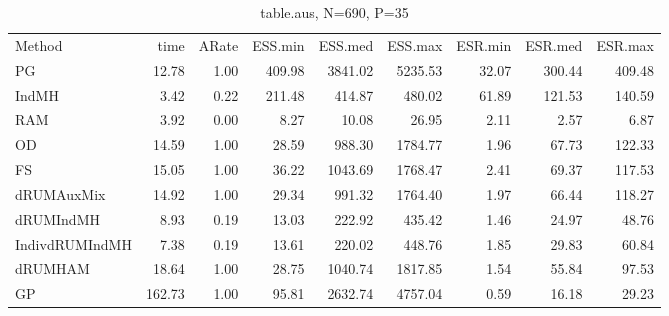 \begin{table}
\label{tab:blogit-aus}
\begin{tabular}{l r r r r r r r r } 
          Method  &     time &    ARate &  ESS.min &  ESS.med &  ESS.max &  ESR.min &  ESR.med &  ESR.max \\ 
              PG  &    12.78 &     1.00 &   409.98 &  3841.02 &  5235.53 &    32.07 &   300.44 &   409.48 \\ 
           IndMH  &     3.42 &     0.22 &   211.48 &   414.87 &   480.02 &    61.89 &   121.53 &   140.59 \\ 
             RAM  &     3.92 &     0.00 &     8.27 &    10.08 &    26.95 &     2.11 &     2.57 &     6.87 \\ 
              OD  &    14.59 &     1.00 &    28.59 &   988.30 &  1784.77 &     1.96 &    67.73 &   122.33 \\ 
              FS  &    15.05 &     1.00 &    36.22 &  1043.69 &  1768.47 &     2.41 &    69.37 &   117.53 \\ 
      dRUMAuxMix  &    14.92 &     1.00 &    29.34 &   991.32 &  1764.40 &     1.97 &    66.44 &   118.27 \\ 
       dRUMIndMH  &     8.93 &     0.19 &    13.03 &   222.92 &   435.42 &     1.46 &    24.97 &    48.76 \\ 
  IndivdRUMIndMH  &     7.38 &     0.19 &    13.61 &   220.02 &   448.76 &     1.85 &    29.83 &    60.84 \\ 
         dRUMHAM  &    18.64 &     1.00 &    28.75 &  1040.74 &  1817.85 &     1.54 &    55.84 &    97.53 \\ 
              GP  &   162.73 &     1.00 &    95.81 &  2632.74 &  4757.04 &     0.59 &    16.18 &    29.23
 \end{tabular}
\caption{table.aus, N=690, P=35}
\end{table}

